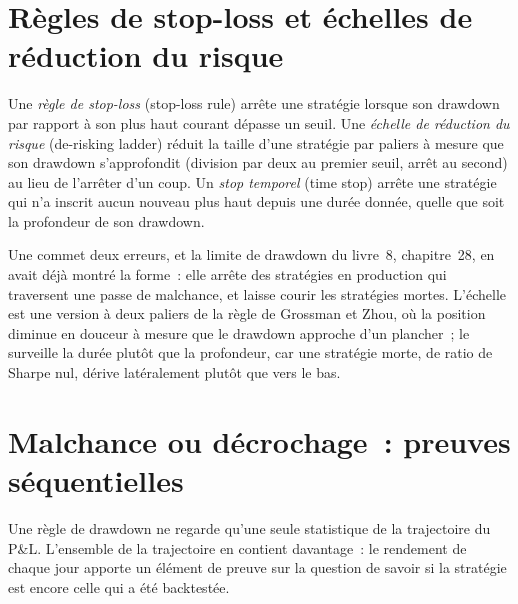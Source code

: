 \section{Règles de stop-loss et échelles de réduction du risque}

\begin{definition}\label{def:fm:managing-a-book-through-drawdown:rules}
Une \emph{règle de stop-loss} (stop-loss rule) arrête une stratégie lorsque son drawdown par rapport à son plus haut courant dépasse un seuil. Une \emph{échelle de
réduction du risque} (de-risking ladder) réduit la taille d'une stratégie par paliers à mesure que son drawdown s'approfondit (division par deux au premier seuil, arrêt au second)
au lieu de l'arrêter d'un coup. Un \emph{stop temporel} (time stop) arrête une stratégie qui n'a inscrit aucun nouveau plus haut depuis une durée donnée,
quelle que soit la profondeur de son drawdown.
\end{definition}

Une  commet deux erreurs, et la limite de drawdown du livre~8, chapitre~28, en avait déjà montré la forme~: elle arrête des stratégies en production qui traversent une passe de
malchance, et laisse courir les stratégies mortes. L'échelle est une version à deux paliers de la règle de Grossman et Zhou, où la position diminue en douceur à mesure que le
drawdown approche d'un plancher~; le  surveille la durée plutôt que la profondeur, car une stratégie morte, de ratio de Sharpe nul, dérive
latéralement plutôt que vers le bas.

\label{lst:fm:managing-a-book-through-drawdown:posterior}

\section{Malchance ou décrochage~: preuves séquentielles}

Une règle de drawdown ne regarde qu'une seule statistique de la trajectoire du P\&L. L'ensemble de la trajectoire en contient davantage~: le rendement de chaque jour apporte un élément de preuve sur la question de savoir si la stratégie
est encore celle qui a été backtestée.

